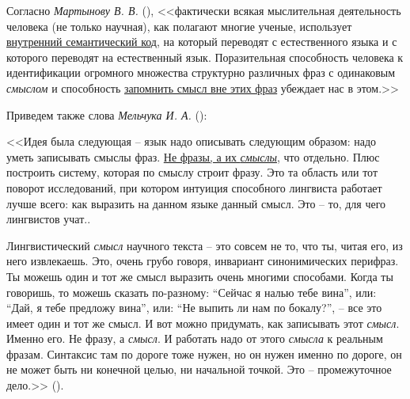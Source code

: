\begin{SCn}
{Согласно \textit{Мартынову В. В.} (), <<фактически всякая мыслительная деятельность человека (не только научная), как полагают многие ученые, использует \uline{внутренний семантический код}, на который переводят с естественного языка и с которого переводят на естественный язык. Поразительная способность человека к идентификации огромного множества структурно различных фраз с одинаковым \textit{смыслом} и способность \uline{запомнить смысл вне этих фраз} убеждает нас в этом.>>

Приведем также слова \textit{Мельчука И. А.} ():

<<Идея была следующая -- язык надо описывать следующим образом: надо уметь записывать смыслы фраз. \uline{Не фразы, а их \textit{смыслы}}, что отдельно. Плюс построить систему, которая по смыслу строит фразу. Это та область или тот поворот исследований, при котором интуиция способного лингвиста работает лучше всего: как выразить на данном языке данный смысл. Это -- то, для чего лингвистов учат..

Лингвистический \textit{смысл} научного текста -- это совсем не то, что ты, читая его, из него извлекаешь. Это, очень грубо говоря, инвариант синонимических перифраз. Ты можешь один и тот же смысл выразить очень многими способами. Когда ты говоришь, то можешь сказать по-разному: ``Сейчас я налью тебе вина'', или: ``Дай, я тебе предложу вина'', или: ``Не выпить ли нам по бокалу?'', -- все это имеет один и тот же смысл. И вот можно придумать, как записывать этот \textit{смысл}. Именно его. Не фразу, а \textit{смысл}. И работать надо от этого \textit{смысла} к реальным фразам. Синтаксис там по дороге тоже нужен, но он нужен именно по дороге, он не может быть ни конечной целью, ни начальной точкой. Это -- промежуточное дело.>> ().
}



\end{SCn}
